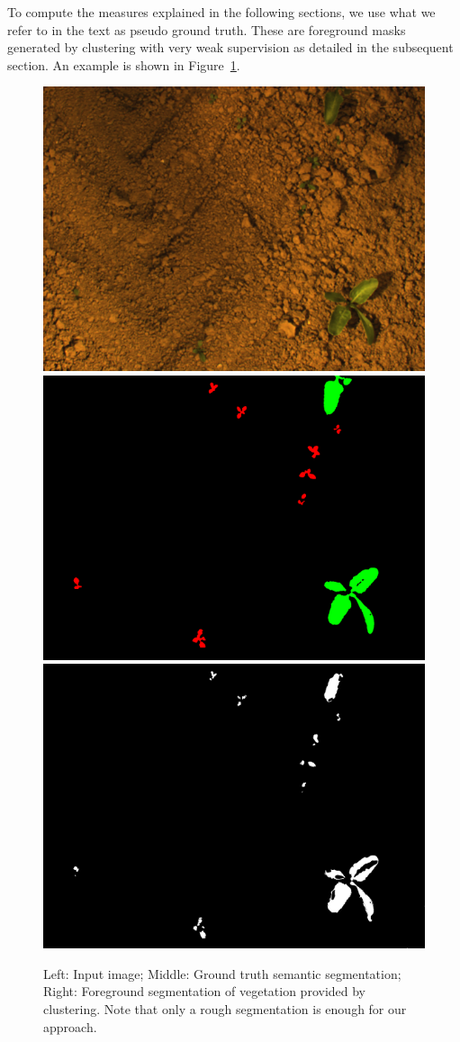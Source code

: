\documentclass[letterpaper, 10 pt, conference]{ieeeconf}  %
\begin{document}
   

To compute the measures explained in the following sections, we use what we refer to in the text as pseudo ground truth. These are foreground masks generated by clustering with very weak supervision as detailed in the subsequent section. An example is shown in Figure~\ref{fig:unsupervised_foreground}.

\begin{figure}
    \centering
    \includegraphics[width=0.32\linewidth]{pics/unsupervised/img_masks_8mm_fromImages_frame256.png}
    \includegraphics[width=0.32\linewidth]{pics/unsupervised/gt_masks_8mm_fromImages_frame256_GroundTruth_iMap.png}
    \includegraphics[width=0.32\linewidth]{pics/unsupervised/lbl_masks_8mm_fromImages_frame256.png}
    \caption{Left: Input image; Middle: Ground truth semantic segmentation; Right: Foreground segmentation of vegetation provided by clustering. Note that only a rough segmentation is enough for our approach.}
    \label{fig:unsupervised_foreground}
\end{figure}
\end{document}
